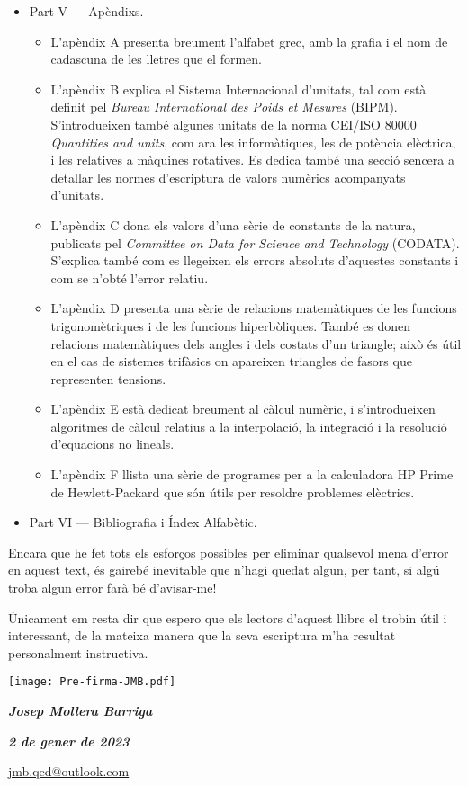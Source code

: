 \begin{itemize}
\begin{itemize}
		\end{itemize}
		\item Part V --- Apèndixs. 
		\begin{itemize}
			\item L'apèndix A presenta breument l'alfabet grec, amb la grafia i el nom de cadascuna de les lletres que el formen.
			\item L'apèndix B explica el Sistema Internacional d'unitats, tal com està definit pel \textit{Bureau International des Poids et Mesures} (BIPM). S'introdueixen també algunes unitats de la norma CEI/ISO 80000 \textit{Quantities and units}, com ara les informàtiques, les de potència elèctrica, i les relatives a màquines rotatives. Es dedica també una secció sencera a detallar les normes d'escriptura de valors numèrics acompanyats d'unitats.
			\item L'apèndix C dona els valors d'una sèrie de constants de la natura,   publicats
			pel \textit{Committee on Data for
			Science and Technology} (CODATA). S'explica també com es llegeixen els errors absoluts d'aquestes constants i com se n'obté l'error relatiu.
			\item L'apèndix D presenta una sèrie de relacions matemàtiques de les funcions trigonomètriques i de les funcions hiperbòliques. També es donen relacions matemàtiques dels angles i dels costats d'un triangle; això és útil en el cas de sistemes trifàsics on apareixen triangles de fasors que representen tensions.
			\item L'apèndix E està dedicat breument al càlcul numèric, i s'introdueixen algoritmes de càlcul relatius a la interpolació, la integració i la resolució d'equacions no lineals.
			\item L'apèndix F llista una sèrie de programes per a la calculadora \textsf{HP Prime} de Hewlett-Packard que són útils per resoldre problemes elèctrics. 
		\end{itemize}
		\item Part VI --- Bibliografia i  Índex Alfabètic.
	\end{itemize}
		

    Encara que he fet tots els esforços possibles per eliminar qualsevol
    mena  d'error en aquest text, és gairebé inevitable que n'hagi quedat algun,
    per tant, si algú troba algun error farà bé d'avisar-me!


   Únicament em resta dir que espero que els lectors d'aquest llibre el trobin    útil i interessant, de la mateixa manera que la seva escriptura m'ha resultat  personalment instructiva.


\hfill
\begin{minipage}[b]{30mm}
    \texttt{[image: Pre-firma-JMB.pdf]}
\end{minipage}

{\large

    \hfill \textbf{\textsl{Josep Mollera Barriga}}

    \hfill \textbf{\textsl{2 de gener de 2023}}

    \hfill {\small \href{mailto:jmb.qed@outlook.com}{\faEnvelope\hspace{2mm}jmb.qed@outlook.com} }

}
